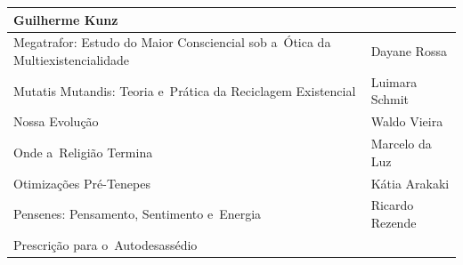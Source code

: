 \documentclass{gescons}
\begin{document}
\begin{longtable}[]{@{}
  >{\raggedright\arraybackslash}p{}
  >{\raggedright\arraybackslash}p{}@{}}
\begin{minipage}[t]{\linewidth}
Guilherme Kunz
\end{minipage} \\
\hline
\begin{minipage}[t]{\linewidth}\raggedright
Megatrafor: Estudo do Maior Consciencial sob a~Ótica da Multiexistencialidade
\end{minipage} & \begin{minipage}[t]{\linewidth}\raggedright
Dayane Rossa
\end{minipage} \\ \addlinespace[4pt]
\hline
\begin{minipage}[t]{\linewidth}\raggedright
Mutatis Mutandis: Teoria e~Prática da Reciclagem Existencial
\end{minipage} & \begin{minipage}[t]{\linewidth}\raggedright
Luimara Schmit
\end{minipage} \\
\hline
\begin{minipage}[t]{\linewidth}\raggedright
Nossa Evolução
\end{minipage} & \begin{minipage}[t]{\linewidth}\raggedright
Waldo Vieira
\end{minipage} \\
\hline
\begin{minipage}[t]{\linewidth}\raggedright
Onde a~Religião Termina
\end{minipage} & \begin{minipage}[t]{\linewidth}\raggedright
Marcelo da Luz
\end{minipage} \\
\hline
\begin{minipage}[t]{\linewidth}\raggedright
Otimizações Pré-Tenepes
\end{minipage} & \begin{minipage}[t]{\linewidth}\raggedright
Kátia Arakaki
\end{minipage} \\
\hline
\begin{minipage}[t]{\linewidth}\raggedright
Pensenes: Pensamento, Sentimento e~Energia
\end{minipage} & \begin{minipage}[t]{\linewidth}\raggedright
Ricardo Rezende
\end{minipage} \\
\hline
\begin{minipage}[t]{\linewidth}\raggedright
Prescrição para o~Autodesassédio
\end{minipage} & \begin{minipage}[t]{\linewidth}\raggedright

\end{minipage}
\end{longtable}
\end{document}
